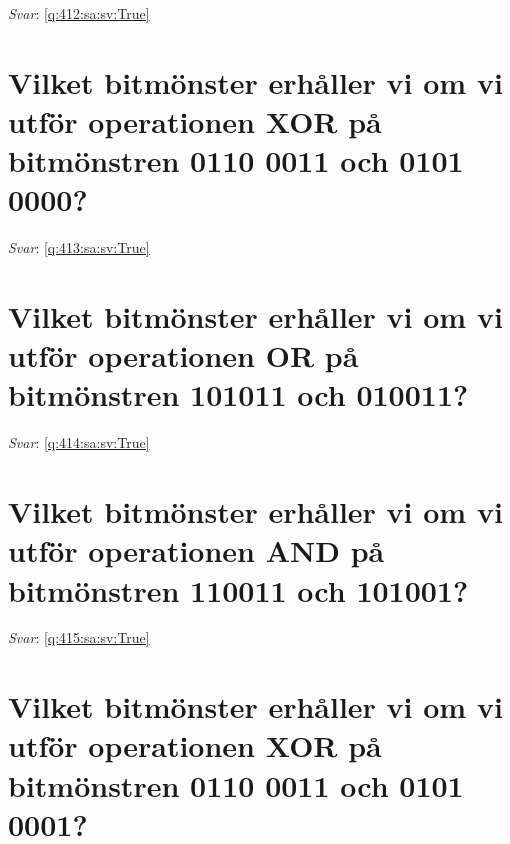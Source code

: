 \documentclass[a4paper,11pt,oneside]{book}
\begin{document}
\begin{sloppypar}
\vspace{1cm}

\textit{Svar}: \autoref{q:412:sa:sv:True}



\section{Vilket bitm\"onster erh\r{a}ller vi om vi utf\"or operationen XOR p\r{a} bitm\"onstren 0110 0011 och 0101 0000?}

\label{q:413:sa:sv:False}

\vspace{2cm}

\noindent\makebox[\textwidth]{\hrulefill}

\vspace{1cm}

\textit{Svar}: \autoref{q:413:sa:sv:True}



\section{Vilket bitm\"onster erh\r{a}ller vi om vi utf\"or operationen OR p\r{a} bitm\"onstren 101011 och 010011?}

\label{q:414:sa:sv:False}

\vspace{2cm}

\noindent\makebox[\textwidth]{\hrulefill}

\vspace{1cm}

\textit{Svar}: \autoref{q:414:sa:sv:True}



\section{Vilket bitm\"onster erh\r{a}ller vi om vi utf\"or operationen AND p\r{a} bitm\"onstren 110011 och 101001?}

\label{q:415:sa:sv:False}

\vspace{2cm}

\noindent\makebox[\textwidth]{\hrulefill}

\vspace{1cm}

\textit{Svar}: \autoref{q:415:sa:sv:True}



\section{Vilket bitm\"onster erh\r{a}ller vi om vi utf\"or operationen XOR p\r{a} bitm\"onstren 0110 0011 och 0101 0001?}


\end{sloppypar}
\end{document}
